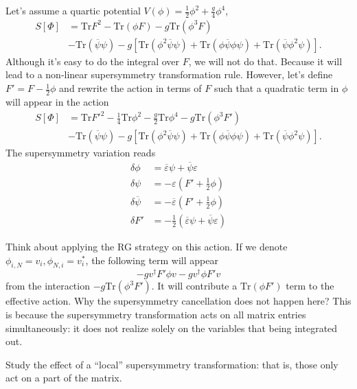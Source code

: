 Let's assume a quartic potential $V(\phi) = \frac{1}{2} \phi^2 + \frac{g}{4} \phi^4$,
\begin{align*}
	S[\Phi] &= \mathrm{Tr} F^2 - \mathrm{Tr} (\phi F) - g \mathrm{Tr}(\phi^3 F) 	 \\
			& - \mathrm{Tr}(\overline{\psi}\psi) - g \left[ \mathrm{Tr}(\phi^2 \overline{\psi} \psi) + \mathrm{Tr} (\phi \overline{\psi} \phi \psi) + \mathrm{Tr}(\overline{\psi} \phi^2 \psi) \right] .
\end{align*}
Although it's easy to do the integral over $F$, we will not do that.
Because it will lead to a non-linear supersymmetry transformation rule.
However, let's define $F' = F - \frac{1}{2} \phi$ and rewrite the action in terms of $F$ such that a quadratic term in $\phi$ will appear in the action
\begin{align*}
	S[\Phi] &= \mathrm{Tr} F'^2 - \frac{1}{4} \mathrm{Tr} \phi^2 - \frac{g}{2} \mathrm{Tr} \phi^4 - g \mathrm{Tr} (\phi^3 F') 	 \\
			& - \mathrm{Tr}(\overline{\psi}\psi) - g \left[ \mathrm{Tr}(\phi^2 \overline{\psi} \psi) + \mathrm{Tr} (\phi \overline{\psi} \phi \psi) + \mathrm{Tr}(\overline{\psi} \phi^2 \psi) \right] .
\end{align*}
The supersymmetry variation reads
\begin{align*}
	\delta \phi &= \overline{\varepsilon} \psi + \overline{\psi} \varepsilon \\
	\delta \psi &= -\varepsilon (F' + \frac{1}{2}\phi) \\
	\delta \overline{\psi} &= - \overline{\varepsilon} (F' + \frac{1}{2}\phi) \\
	\delta F' &= -\frac{1}{2} (\overline{\varepsilon}\psi + \overline{\psi}\varepsilon)
\end{align*}

Think about applying the RG strategy on this action.
If we denote $\phi_{i,N}=v_i,\phi_{N,i}=v_i^*$, the following term will appear
\[
-g v^\dagger F' \phi v - g v^\dagger \phi F' v
\] 
from the interaction $-g \mathrm{Tr} (\phi^3 F')$.
It will contribute a $\mathrm{Tr}(\phi F')$ term to the effective action.
Why the supersymmetry cancellation does not happen here?
This is because the supersymmetry transformation acts on all matrix entries simultaneously: it does not realize solely on the variables that being integrated out.

\begin{idea}
Study the effect of a ``local'' supersymmetry transformation: that is, those only act on a part of the matrix.	
\end{idea}

